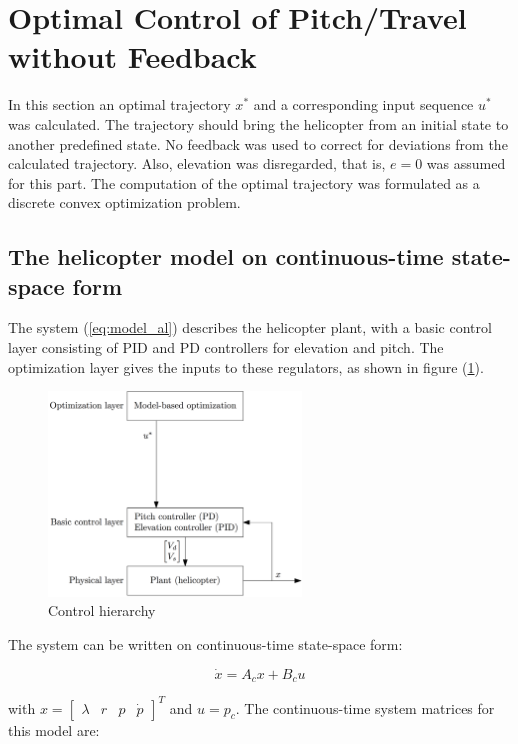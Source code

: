 \section{Optimal Control of Pitch/Travel without Feedback}\label{sec:prob2}

In this section an optimal trajectory $x^*$ and a corresponding input sequence $u^*$ was calculated. The trajectory should bring the helicopter from an initial state to another predefined state. No feedback was used to correct for deviations from the calculated trajectory. Also, elevation was disregarded, that is, $e=0$ was assumed for this part. The computation of the optimal trajectory was formulated as a discrete convex optimization problem.


\subsection{The helicopter model on continuous-time state-space form}

The system (\ref{eq:model_al}) describes the helicopter plant, with a basic control layer consisting of PID and PD controllers for elevation and pitch. The optimization layer gives the inputs to these regulators, as shown in figure (\ref{fig:control_hierarchy}).

\begin{figure}[ht]
	\centering
	\includegraphics[width=0.6\textwidth]{figures/day2/control_hierarchy_day2}
	\caption{Control hierarchy}
	\label{fig:control_hierarchy}
\end{figure}

The system can be written on continuous-time state-space form:

\begin{equation}
    \dot{x} = A_cx + B_cu
    \label{eq:state_space_axbu}
\end{equation}

with $x = \begin{bmatrix} \lambda & r & p & \dot{p} \end{bmatrix}^T$ and $u = p_c$.
The continuous-time system matrices for this model are:

